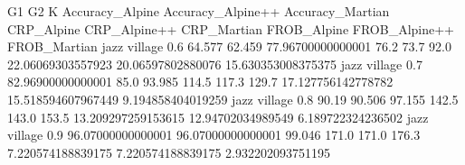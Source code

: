 G1 G2 K Accuracy_Alpine Accuracy_Alpine++ Accuracy_Martian CRP_Alpine CRP_Alpine++ CRP_Martian FROB_Alpine FROB_Alpine++ FROB_Martian
jazz village 0.6 64.577 62.459 77.96700000000001 76.2 73.7 92.0 22.06069303557923 20.06597802880076 15.630353008375375
jazz village 0.7 82.96900000000001 85.0 93.985 114.5 117.3 129.7 17.127756142778782 15.518594607967449 9.194858404019259
jazz village 0.8 90.19 90.506 97.155 142.5 143.0 153.5 13.209297259153615 12.94702034989549 6.189722324236502
jazz village 0.9 96.07000000000001 96.07000000000001 99.046 171.0 171.0 176.3 7.220574188839175 7.220574188839175 2.932202093751195
